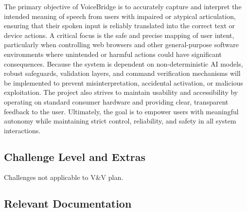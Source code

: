 \documentclass[12pt, titlepage]{article}
\begin{document}
The primary objective of VoiceBridge is to accurately capture and interpret the intended meaning of speech from users with impaired or atypical articulation, ensuring that their spoken input is reliably translated into the correct text or device actions. A critical focus is the safe and precise mapping of user intent, particularly when controlling web browsers and other general-purpose software environments where unintended or harmful actions could have significant consequences. Because the system is dependent on non-deterministic AI models, robust safeguards, validation layers, and command verification mechanisms will be implemented to prevent misinterpretation, accidental activation, or malicious exploitation. The project also strives to maintain usability and accessibility by operating on standard consumer hardware and providing clear, transparent feedback to the user. Ultimately, the goal is to empower users with meaningful autonomy while maintaining strict control, reliability, and safety in all system interactions.

\subsection{Challenge Level and Extras}

Challenges not applicable to V\&V plan.

\subsection{Relevant Documentation}



\end{document}
